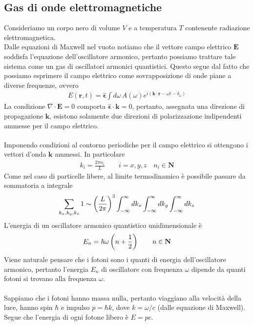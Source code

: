 \documentclass{article}
\begin{document}
\subsection{Gas di onde elettromagnetiche}
Consideriamo un corpo nero di volume $V$ e a temperatura $T$ contenente radiazione elettromagnetica. \\
Dalle equazioni di Maxwell nel vuoto notiamo che il vettore campo elettrico $\mathbf{E}$ soddisfa l'equazione dell'oscillatore armonico, pertanto possiamo trattare tale sistema come un gas di oscillatori armonici quantistici. Questo segue dal fatto che possiamo esprimere il campo elettrico come sovrapposizione di onde piane a diverse frequenze, ovvero
\begin{align}
    E(\mathbf{r}, t) = \hat{\boldsymbol{\epsilon}}\int d\omega \, A(\omega)e^{i(\mathbf{k} \cdot \mathbf{r} - \omega t - \delta_\omega)} \tag{4.7.1}
\end{align}
La condizione $\nabla \cdot \mathbf{E} = 0$ comporta $\hat{\boldsymbol{\epsilon}} \cdot \mathbf{k} = 0$, pertanto, assegnata una direzione di propagazione $\mathbf{k}$, esistono solamente due direzioni di polarizzazione indipendenti ammesse per il campo elettrico. \\ \\
Imponendo condizioni al contorno periodiche per il campo elettrico si ottengono i vettori d'onda $\mathbf{k}$ ammessi. In particolare
\begin{align}
    k_i = \frac{2\pi n_i}{L} \qquad i = x, y, z \quad n_i \in \mathbf{N} \tag{4.7.2}
\end{align}
Come nel caso di particelle libere, al limite termodinamico è possibile passare da sommatoria a integrale
\begin{align}
    \sum_{k_x, k_y, k_z} 1 \sim \left(\frac{L}{2\pi}\right)^3\int_{-\infty}^\infty dk_x \int_{-\infty}^\infty dk_y \int_{-\infty}^\infty dk_z \notag
\end{align}
L'energia di un oscillatore armonico quantistico unidimensionale è
\begin{align}
    E_n = \hbar\omega\left(n + \frac{1}{2}\right) \qquad n \in \mathbf{N} \notag
\end{align}
Viene naturale pensare che i fotoni sono i quanti di energia dell'oscillatore armonico, pertanto l'energia $E_n$ di oscillatore con frequenza $\omega$ dipende da quanti fotoni si trovano alla frequenza $\omega$. \\ \\
Sappiamo che i fotoni hanno massa nulla, pertanto viaggiano alla velocità della luce, hanno spin $\hbar$ e impulso $p = \hbar k$, dove $k = \omega/c$ (dalle equazione di Maxwell). Segue che l'energia di ogni fotone libero è $E = pc$. \\ \\
\end{document}
